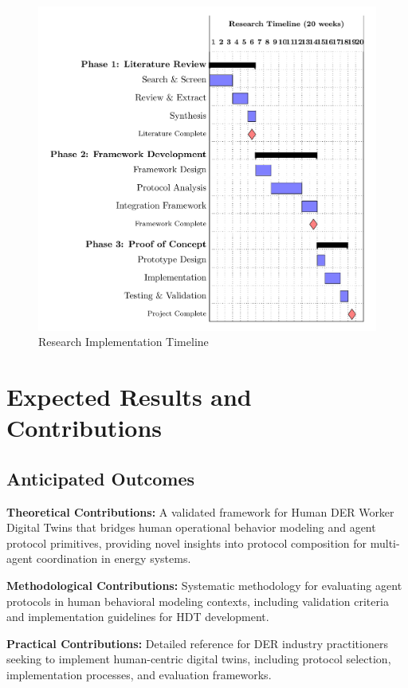 \documentclass[12pt,a4paper]{article}
\begin{document}
\begin{figure}[h!]
    \centering
    \includegraphics[width=.8\linewidth]{timeline-gantt-simple-1.png}
    \caption{Research Implementation Timeline}
    \label{fig:timeline}
\end{figure}

\section{Expected Results and Contributions}
\label{sec:results}

\subsection{Anticipated Outcomes}

\noindent \textbf{Theoretical Contributions:} A validated framework for Human DER Worker Digital Twins that bridges human operational behavior modeling and agent protocol primitives, providing novel insights into protocol composition for multi-agent coordination in energy systems.

\noindent \textbf{Methodological Contributions:} Systematic methodology for evaluating agent protocols in human behavioral modeling contexts, including validation criteria and implementation guidelines for HDT development.

\noindent \textbf{Practical Contributions:} Detailed reference for DER industry practitioners seeking to implement human-centric digital twins, including protocol selection, implementation processes, and evaluation frameworks.
\end{document}
